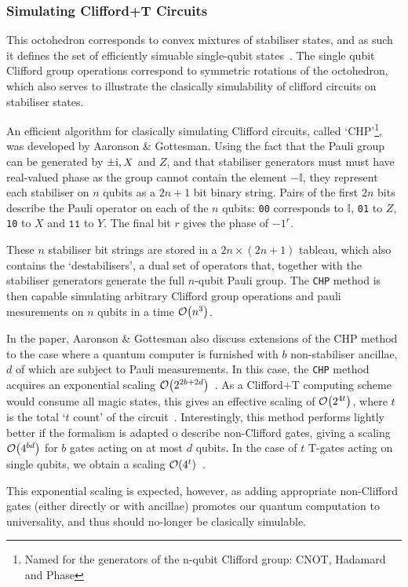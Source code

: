\documentclass{standalone}
\begin{document}
\subsubsection{Simulating Clifford+T Circuits}\label{sec:CHP}
This octohedron corresponds to convex mixtures of stabiliser states, and as such it defines the set of efficiently simuable single-qubit states~\cite{Howard2014}. The single qubit Clifford group operations correspond to symmetric rotations of the octohedron, which also serves to illustrate the clasically simulability of clifford circuits on stabiliser states. 
\par
An efficient algorithm for clasically simulating Clifford circuits, called `CHP'\footnote{Named for the generators of the n-qubit Clifford group: CNOT, Hadamard and Phase}, was developed by Aaronson \& Gottesman. Using the fact that the Pauli group can be generated by $\pm\mathrm{i}, X$ and $Z$, and that stabiliser generators must must have real-valued phase as the group cannot contain the element $-\mathbb{I}$, they represent each stabiliser on $n$ qubits as a $2n+1$ bit binary string. Pairs of the first $2n$ bits describe the Pauli operator on each of the $n$ qubits: \texttt{00} corresponds to $\mathbb{I}$, \texttt{01} to $Z$, \texttt{10} to $X$ and $\texttt{11}$ to $Y$. The final bit $r$ gives the phase of $-1^{r}$.
\par
These $n$ stabiliser bit strings are stored in a $2n\times(2n+1)$ tableau, which also contains the `destabilisers', a dual set of operators that, together with the stabiliser generators generate the full $n$-qubit Pauli group. The \texttt{CHP} method is then capable simulating arbitrary Clifford group operations and pauli mesurements on $n$ qubits in a time $\order{n^{3}}$.
\par
In the paper, Aaronson \& Gottesman also discuss extensions of the CHP method to the case where a quantum computer is furnished with $b$ non-stabiliser ancillae, $d$ of which are subject to Pauli measurements. In this case, the \texttt{CHP} method acquires an exponential scaling $\order{2^{2b+2d}}$~\cite{Aaronson2004a}. As a Clifford+T computing scheme would consume all magic states, this gives an effective scaling of $\order{2^{4t}}$, where $t$ is the total `$t$ count' of the circuit~\cite{Bravyi2015,Aaronson2004a}. Interestingly, this method performs lightly better if the formalism is adapted o describe non-Clifford gates, giving a scaling $\order{4^{bd}}$ for $b$ gates acting on at most $d$ qubits. In the case of $t$ T-gates acting on single qubits, we obtain a scaling $\order{4^{t}}$~\cite{Aaronson2004a}.
\par
This exponential scaling is expected, however, as adding appropriate non-Clifford gates (either directly or with ancillae) promotes our quantum computation to universality, and thus should no-longer be clasically simulable.
\ifstandalone 

\fi
\end{document}
